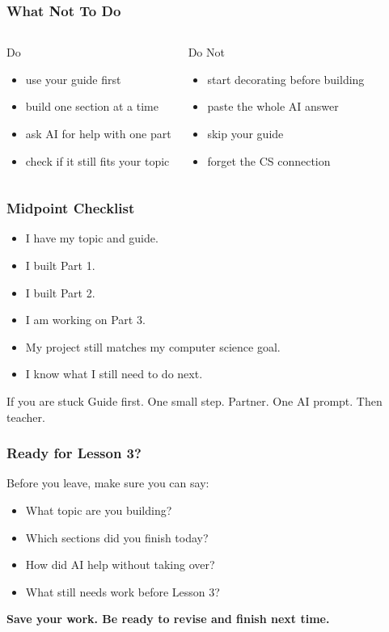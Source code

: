 \documentclass[aspectratio=169]{beamer}
\begin{document}
\begin{frame}[plain]
\frametitle{What Not To Do}
\begin{columns}[T,totalwidth=\textwidth]
\begin{block}{Do}
\begin{itemize}
\large
\item use your guide first
\item build one section at a time
\item ask AI for help with one part
\item check if it still fits your topic
\end{itemize}
\end{block}
\begin{block}{Do Not}
\begin{itemize}
\large
\item start decorating before building
\item paste the whole AI answer
\item skip your guide
\item forget the CS connection
\end{itemize}
\end{block}
\end{columns}
\end{frame}

\begin{frame}[plain]
\frametitle{Midpoint Checklist}
\begin{itemize}
\large
\item I have my topic and guide.
\item I built Part 1.
\item I built Part 2.
\item I am working on Part 3.
\item My project still matches my computer science goal.
\item I know what I still need to do next.
\end{itemize}
\vspace{0.2cm}
\begin{block}{If you are stuck}
\large Guide first. One small step. Partner. One AI prompt. Then teacher.
\end{block}
\end{frame}

\begin{frame}[plain]
\frametitle{Ready for Lesson 3?}
\begin{block}{Before you leave, make sure you can say:}
\begin{itemize}
\large
\item What topic are you building?
\item Which sections did you finish today?
\item How did AI help without taking over?
\item What still needs work before Lesson 3?
\end{itemize}
\end{block}
\vspace{0.2cm}
\begin{center}
\Large\bfseries Save your work. Be ready to revise and finish next time.
\end{center}
\end{frame}
\end{document}
